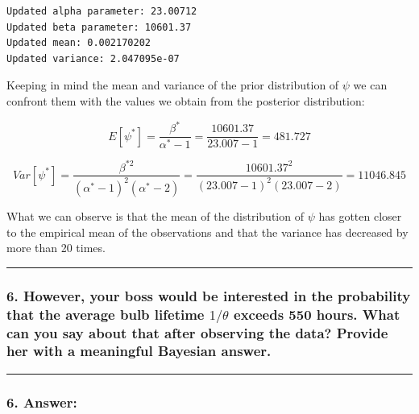 \documentclass[
]{article}
\begin{document}
\begin{verbatim}
Updated alpha parameter: 23.00712 
Updated beta parameter: 10601.37 
Updated mean: 0.002170202 
Updated variance: 2.047095e-07
\end{verbatim}

Keeping in mind the mean and variance of the prior distribution of
\(\psi\) we can confront them with the values we obtain from the
posterior distribution:

\[
E[\psi^*] =
\frac{\beta^*}{\alpha^* - 1} =
\frac{10601.37}{23.007 - 1} =
481.727
\]

\[
Var[\psi^*] =
\frac{\beta^{*2}}{(\alpha^* - 1)^2(\alpha^* - 2)} =
\frac{10601.37^2}{(23.007 - 1)^2(23.007 - 2)} =
11046.845
\]

What we can observe is that the mean of the distribution of \(\psi\) has
gotten closer to the empirical mean of the observations and that the
variance has decreased by more than 20 times.

\begin{center}\rule{0.5\linewidth}{0.5pt}\end{center}

\hypertarget{however-your-boss-would-be-interested-in-the-probability-that-the-average-bulb-lifetime-1theta-exceeds-550-hours.-what-can-you-say-about-that-after-observing-the-data-provide-her-with-a-meaningful-bayesian-answer.}{%
\subsubsection{\texorpdfstring{6. However, your boss would be interested
in the probability that the average bulb lifetime \(1/\theta\) exceeds
550 hours. What can you say about that after observing the data? Provide
her with a meaningful Bayesian
answer.}{6. However, your boss would be interested in the probability that the average bulb lifetime 1/\textbackslash theta exceeds 550 hours. What can you say about that after observing the data? Provide her with a meaningful Bayesian answer.}}\label{however-your-boss-would-be-interested-in-the-probability-that-the-average-bulb-lifetime-1theta-exceeds-550-hours.-what-can-you-say-about-that-after-observing-the-data-provide-her-with-a-meaningful-bayesian-answer.}}

\begin{center}\rule{0.5\linewidth}{0.5pt}\end{center}

\hypertarget{answer-9}{%
\subsubsection{6. Answer:}\label{answer-9}}
\end{document}
